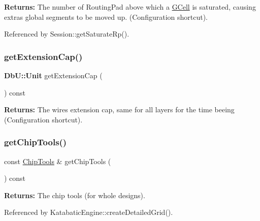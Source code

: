 {\bfseries Returns\+:} The number of Routing\+Pad above which a \mbox{\hyperlink{classKatabatic_1_1GCell}{G\+Cell}} is saturated, causing extras global segments to be moved up. (Configuration shortcut). 

Referenced by Session\+::get\+Saturate\+Rp().

\mbox{\label{classKatabatic_1_1KatabaticEngine_ad9072cfa6215c92c9a9842270cf677c5}} 
\subsubsection{\texorpdfstring{get\+Extension\+Cap()}{getExtensionCap()}}
{\footnotesize\ttfamily \textbf{ Db\+U\+::\+Unit} get\+Extension\+Cap (\begin{DoxyParamCaption}{ }\end{DoxyParamCaption}) const\hspace{0.3cm}{\ttfamily [inline]}}

{\bfseries Returns\+:} The wires extension cap, same for all layers for the time beeing (Configuration shortcut). \mbox{\label{classKatabatic_1_1KatabaticEngine_a423f5f2214c8b9fe73da9a86b6f6d9b9}} 
\subsubsection{\texorpdfstring{get\+Chip\+Tools()}{getChipTools()}}
{\footnotesize\ttfamily const \mbox{\hyperlink{classKatabatic_1_1ChipTools}{Chip\+Tools}} \& get\+Chip\+Tools (\begin{DoxyParamCaption}{ }\end{DoxyParamCaption}) const\hspace{0.3cm}{\ttfamily [inline]}}

{\bfseries Returns\+:} The chip tools (for whole designs). 

Referenced by Katabatic\+Engine\+::create\+Detailed\+Grid().

\mbox{\label{classKatabatic_1_1KatabaticEngine_aecbe8bdcc61024a7539de3ea932c5e06}} 
